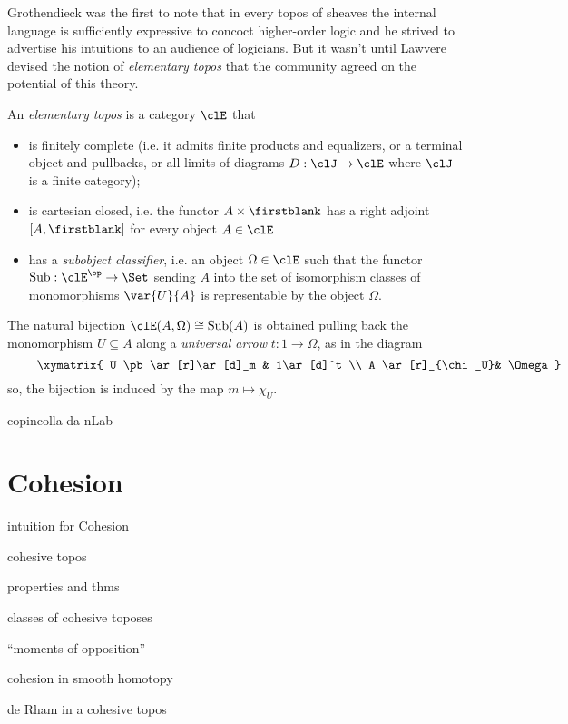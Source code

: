 \documentclass{amsart}
\begin{document}
Grothendieck was the first to note that in every topos of sheaves the internal language is sufficiently expressive to concoct higher-order logic and he strived to advertise his intuitions to an audience of logicians. But it wasn't until Lawvere devised the notion of \emph{elementary topos} that the community agreed on the potential of this theory.
\begin{definition}
  An \emph{elementary topos} is a category $\clE$ that
  \begin{itemize}
  \item is finitely complete (i.e. it admits finite products and equalizers, or a terminal object and pullbacks, or all limits of diagrams $D : \clJ \to \clE$ where $\clJ$ is a finite category);
  \item is cartesian closed, i.e. the functor $A\times\firstblank$ has a right adjoint $[A,\firstblank]$ for every object $A\in\clE$
  \item has a \emph{subobject classifier}, i.e. an object $\Omega\in\clE$ such that the functor $\text{Sub} : \clE^\op\to \Set$ sending $A$ into the set of isomorphism classes of monomorphisms $\var{U}{A}$ is representable by the object $\Omega$.
  \end{itemize}
  The natural bijection $\clE(A,\Omega)\cong\text{Sub}(A)$ is obtained pulling back the monomorphism $U\subseteq A$ along a \emph{universal arrow} $t : 1\to \Omega$, as in the diagram
	\[
		\vcenter{\xymatrix{
				U \pb\ar[r]\ar[d]_m & 1\ar[d]^t \\
				A \ar[r]_{\chi_U}& \Omega
			}}
	\]
	so, the bijection is induced by the map $m\mapsto \chi_U$.
\end{definition}
\begin{definition}
  copincolla da nLab
\end{definition}
\section{Cohesion}
intuition for Cohesion

cohesive topos

properties and thms

classes of cohesive toposes

``moments of opposition''

cohesion in smooth homotopy

de Rham in a cohesive topos
\end{document}
